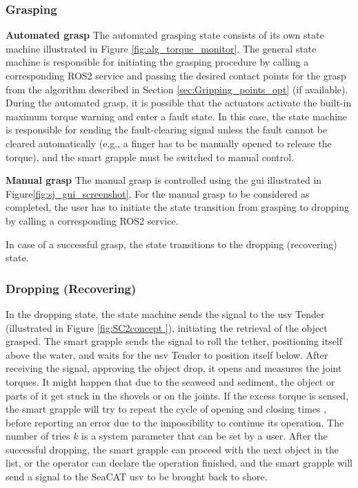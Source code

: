 \subsubsection{Grasping}
\textbf{Automated grasp}
The automated grasping state consists of its own state machine illustrated in Figure \ref{fig:alg_torque_monitor}. The general state machine is responsible for initiating the grasping procedure by calling a corresponding \gls{ROS2} service and passing the desired contact points for the grasp from the algorithm described in Section \ref{sec:Gripping_points_opt} (if available). During the automated grasp, it is possible that the actuators activate the built-in maximum torque warning and enter a fault state. In this case, the state machine is responsible for sending the fault-clearing signal unless the fault cannot be cleared automatically (e.g., a finger has to be manually opened to release the torque), and the smart grapple must be switched to manual control. 

\textbf{Manual grasp}
The manual grasp is controlled using the \gls{gui} illustrated in Figure\ref{fig:sj_gui_screenshot}. For the manual grasp to be considered as completed, the user has to initiate the state transition from grasping to dropping by calling a corresponding \gls{ROS2} service.

In case of a successful grasp, the state transitions to the dropping (recovering) state.

\subsubsection{Dropping (Recovering)}
In the dropping state, the state machine sends the signal to the \gls{usv} Tender (illustrated in Figure \ref{fig:SC2concept }), initiating the retrieval of the object grasped. The smart grapple sends the signal to roll the tether, positioning itself above the water, and waits for the \gls{usv} Tender to position itself below. After receiving the signal, approving the object drop, it opens and measures the joint torques. It might happen that due to the seaweed and sediment, the object or parts of it get stuck in the shovels or on the joints. If the excess torque is sensed, the smart grapple will try to repeat the cycle of opening and closing  times , before reporting an error due to the impossibility to continue its operation. The number of tries \(k\) is a system parameter that can be set by a user. After the successful dropping, the smart grapple can proceed with the next object in the list, or the operator can declare the operation finished, and the smart grapple will send a signal to the SeaCAT \gls{usv} to be brought back to shore.

